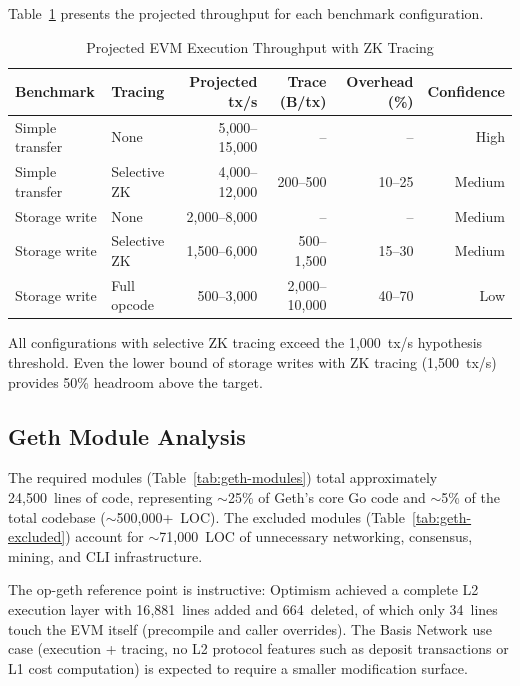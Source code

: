 Table~\ref{tab:throughput} presents the projected throughput for each
benchmark configuration.

\begin{table}[htbp]
\caption{Projected EVM Execution Throughput with ZK Tracing}
\label{tab:throughput}
\centering
\begin{tabular}{llrrrr}
\toprule
\textbf{Benchmark} & \textbf{Tracing} & \textbf{Projected tx/s} & \textbf{Trace (B/tx)} & \textbf{Overhead (\%)} & \textbf{Confidence} \\
\midrule
Simple transfer & None & 5{,}000--15{,}000 & -- & -- & High \\
Simple transfer & Selective ZK & 4{,}000--12{,}000 & 200--500 & 10--25 & Medium \\
Storage write & None & 2{,}000--8{,}000 & -- & -- & Medium \\
Storage write & Selective ZK & 1{,}500--6{,}000 & 500--1{,}500 & 15--30 & Medium \\
Storage write & Full opcode & 500--3{,}000 & 2{,}000--10{,}000 & 40--70 & Low \\
\bottomrule
\end{tabular}
\end{table}

All configurations with selective ZK tracing exceed the 1{,}000~tx/s hypothesis
threshold. Even the lower bound of storage writes with ZK tracing
(1{,}500~tx/s) provides 50\% headroom above the target.

\subsection{Geth Module Analysis}

The required modules (Table~\ref{tab:geth-modules}) total approximately
24{,}500~lines of code, representing ${\sim}$25\% of Geth's core Go code and
${\sim}$5\% of the total codebase (${\sim}$500{,}000+~LOC). The excluded modules
(Table~\ref{tab:geth-excluded}) account for ${\sim}$71{,}000~LOC of unnecessary
networking, consensus, mining, and CLI infrastructure.

The op-geth reference point is instructive: Optimism achieved a complete L2
execution layer with 16{,}881~lines added and 664~deleted, of which only
34~lines touch the EVM itself (precompile and caller overrides). The Basis
Network use case (execution + tracing, no L2 protocol features such as deposit
transactions or L1 cost computation) is expected to require a smaller
modification surface.
